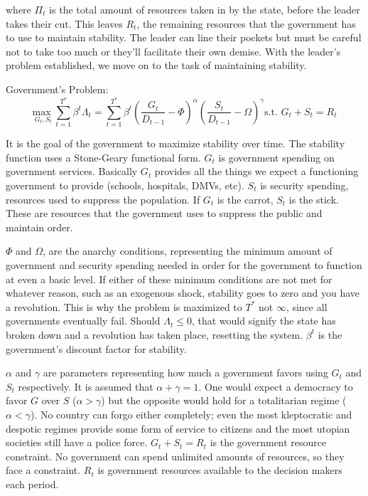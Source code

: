 \documentclass[12pt]{article}
\begin{document}
\begin{spacing}{1.5}
\noindent where ${\Pi}_t$ is the total amount of resources taken in by the state, before the leader takes their cut. This leaves $R_t$, the remaining resources that the government has to use to maintain stability. The leader can line their pockets but must be careful not to take too much or they'll facilitate their own demise. With the leader's problem established, we move on to the task of maintaining stability.   
\vspace{.5 em}

\noindent Government's Problem:
\begin{equation}
{\underset{G_t,S_t}{\text{max }}} \sum\limits_{t=1}^{T^*} \beta^t {\Lambda}_t = \sum\limits_{t=1}^{T^*} \beta^t\left(\frac{G_t}{D_{t-1}}-\Phi\right)^\alpha \left(\frac{S_t}{D_{t-1}}-\Omega\right)^\gamma   \text{s.t. } G_t+S_t=R_t
\end{equation}

It is the goal of the government to maximize stability over time. The stability function uses a Stone-Geary functional form. $G_t$ is government spending on government services. Basically $G_t$ provides all the things we expect a functioning government to provide (schools, hospitals, DMVs, etc). $S_t$ is security spending, resources used to suppress the population. If $G_t$ is the carrot, $S_t$ is the stick. These are resources that the government uses to suppress the public and maintain order. 


$\Phi$ and $\Omega$, are the anarchy conditions, representing the minimum amount of government and security spending needed in order for the government to function at even a basic level. If either of these minimum conditions are not met for whatever reason, such as an exogenous shock, stability goes to zero and you have a revolution. This is why the problem is maximized to $T^*$ not $\infty$, since all governments eventually fail. Should $\Lambda_t \leq 0$, that would signify the state has broken down and a revolution has taken place, resetting the system. $\beta^t$ is the government's discount factor for stability. 

$\alpha$ and $\gamma $ are parameters representing how much a government favors using $G_t$ and $S_t$ respectively. It is assumed that $\alpha+\gamma=1$. One would expect a democracy to favor $G$ over $S$ ($\alpha > \gamma$) but the opposite would hold for a totalitarian regime ($\alpha < \gamma $). No country can forgo either completely; even the most kleptocratic and despotic regimes provide some form of service to citizens and the most utopian societies still have a police force. $G_t+S_t=R_t$ is the government resource constraint. No government can spend unlimited amounts of resources, so they face a constraint. $R_t$ is government resources available to the decision makers each period. 


\end{spacing}
\end{document}
